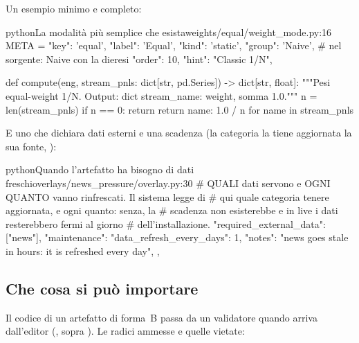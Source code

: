 \noindent
Un esempio minimo e completo:

\begin{codiceInterno}{python}{La modalità più semplice che esista}{weights/equal/weight\_mode.py:16}
META = {
    "key": 'equal',
    "label": 'Equal',
    "kind": 'static',
    "group": 'Naive',     # nel sorgente: Naive con la dieresi
    "order": 10,
    "hint": "Classic 1/N",
}

def compute(eng, stream_pnls: dict[str, pd.Series]) -> dict[str, float]:
    """Pesi equal-weight 1/N. Output: dict {stream_name: weight}, somma 1.0."""
    n = len(stream_pnls)
    if n == 0:
        return {}
    return {name: 1.0 / n for name in stream_pnls}
\end{codiceInterno}

\noindent
E uno che dichiara dati esterni e una scadenza (la categoria la tiene
aggiornata la sua fonte, ):

\begin{codiceInterno}{python}{Quando l'artefatto ha bisogno di dati freschi}{overlays/news\_pressure/overlay.py:30}
    # QUALI dati servono e OGNI QUANTO vanno rinfrescati. Il sistema legge di
    # qui quale categoria tenere aggiornata, e ogni quanto: senza, la
    # scadenza non esisterebbe e in live i dati resterebbero fermi al giorno
    # dell'installazione.
    "required_external_data": ["news"],
    "maintenance": {
        "data_refresh_every_days": 1,
        "notes": "news goes stale in hours: it is refreshed every day",
    },
\end{codiceInterno}

\subsection{Che cosa si può importare}

Il codice di un artefatto di forma~B passa da un validatore 
quando arriva dall'editor (, sopra
). Le radici ammesse e quelle vietate:

